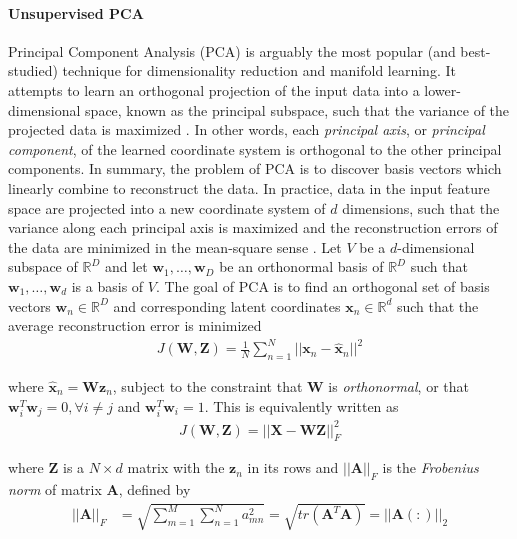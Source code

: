 \paragraph{Unsupervised PCA}
Principal Component Analysis (PCA) is arguably the most popular (and best-studied) technique for dimensionality reduction and manifold learning.  It attempts to learn an orthogonal projection of the input data into a lower-dimensional space, known as the principal subspace, such that the variance of the projected data is maximized \citep{Chao2019RecentAdvancesSupervisedDimRed}.  In other words, each \textit{principal axis}, or \textit{principal component}, of the learned coordinate system is orthogonal to the other principal components.  In summary, the problem of PCA is to discover basis vectors which linearly combine to reconstruct the data.  In practice, data in the input feature space are projected into a new coordinate system of $d$ dimensions, such that the variance along each principal axis is maximized and the reconstruction errors of the data are minimized in the mean-square sense \citep{Thorstensen2009ManifoldThesis}.  Let $V$ be a $d$-dimensional subspace of $\mathbb{R}^{D}$ and let  $\bm{w}_1, \dots, \bm{w}_D$ be an orthonormal basis of $\mathbb{R}^{D}$ such that $\bm{w}_1, \dots, \bm{w}_d$ is a basis of $V$.  The goal of PCA is to find an orthogonal set of basis vectors $\bm{w}_n \in \mathbb{R}^{D}$ and corresponding latent coordinates $\bm{x}_n \in \mathbb{R}^{d}$ such that the average reconstruction error is minimized \citep{Murphy2012}
\begin{align}
	J(\bm{W}, \bm{Z}) = \frac{1}{N}\sum_{n=1}^{N} ||\bm{x}_n - \hat{\bm{x}}_n ||^{2}
\end{align}

\noindent
where $\hat{\bm{x}}_n = \bm{W}\bm{z}_{n}$, subject to the constraint that $\bm{W}$ is \textit{orthonormal}, or that $\bm{w}_{i}^{T}\bm{w}_{j}=0,\forall i \neq j$ and $\bm{w}_{i}^{T}\bm{w}_{i}=1 $.  This is equivalently written as 
\begin{align}
		J(\bm{W}, \bm{Z}) = ||\bm{X} - \bm{W}\bm{Z} ||^{2}_{F}
\end{align}

\noindent
where $\bm{Z}$ is a $N \times d$ matrix with the $\bm{z}_{n}$ in its rows and $||\bm{A}||_{F}$ is the \textit{Frobenius norm} of matrix $\bm{A}$, defined by 
\begin{align}
	||\bm{A}||_{F} &= \sqrt{\sum_{m=1}^{M}\sum_{n=1}^{N}a^{2}_{mn}} = \sqrt{tr(\bm{A}^{T}\bm{A})} = ||\bm{A}(:)||_{2}
\end{align} 

